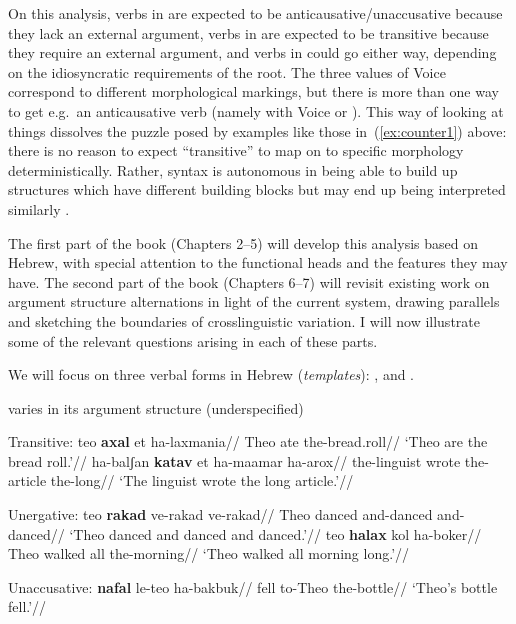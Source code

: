 On this analysis, verbs in {\tnif} are expected to be anticausative/unaccusative because they lack an external argument, verbs in {\thif} are expected to be transitive because they require an external argument, and verbs in {\tkal} could go either way, depending on the idiosyncratic requirements of the root. The three values of Voice correspond to different morphological markings, but there is more than one way to get e.g.~an anticausative verb (namely with Voice or {\vz}). This way of looking at things dissolves the puzzle posed by examples like those in~(\ref{ex:counter1}) above: there is no reason to expect ``transitive'' to map on to specific morphology deterministically. Rather, syntax is autonomous in being able to build up structures which have different building blocks but may end up being interpreted similarly \citep{wood15springer,woodmarantz17,kastner16phd,myler16mit}.

The first part of the book (Chapters 2--5) will develop this analysis based on Hebrew, with special attention to the functional heads and the features they may have. The second part of the book (Chapters 6--7) will revisit existing work on argument structure alternations in light of the current system, drawing parallels and sketching the boundaries of crosslinguistic variation. I will now illustrate some of the relevant questions arising in each of these parts.



We will focus on three verbal forms in Hebrew (\emph{templates}): {\tkal}, {\tnif} and {\thif}.


{\tkal} varies in its argument structure (underspecified)

\pex Transitive:
	\a \begingl
		\gla teo \textbf{axal} et ha-laxmania//
		\glb Theo ate  the-bread.roll//
		\glft `Theo are the bread roll.'//
	\endgl
	\a \begingl
		\gla ha-balʃan \textbf{katav} et ha-maamar ha-arox//
		\glb the-linguist wrote  the-article the-long//
		\glft `The linguist wrote the long article.'//
	\endgl
\xe

\pex Unergative:
	\a \begingl
		\gla teo \textbf{rakad} ve-rakad ve-rakad//
		\glb Theo danced and-danced and-danced//
		\glft `Theo danced and danced and danced.'//
	\endgl
	\a \begingl
		\gla teo \textbf{halax} kol ha-boker//
		\glb Theo walked all the-morning//
		\glft `Theo walked all morning long.'//
	\endgl
\xe

\pex Unaccusative:
	\a \begingl
		\gla \textbf{nafal} le-teo ha-bakbuk//
		\glb fell to-Theo the-bottle//
		\glft `Theo's bottle fell.'//
	\endgl
	
